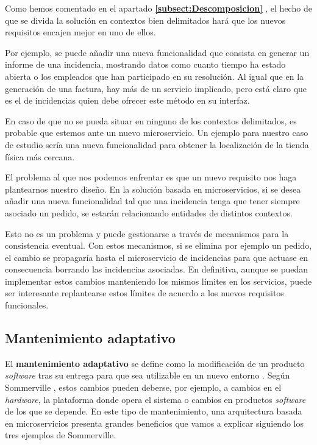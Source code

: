 \documentclass[11pt,spanish,listoffigures]{tfgetsinf}
\begin{document}
Como hemos comentado en el apartado \textbf{\ref{subsect:Descomposicion} }, el hecho de que se divida la solución en contextos bien delimitados hará que los nuevos requisitos encajen mejor en uno de ellos.

Por ejemplo, se puede añadir una nueva funcionalidad que consista en generar un informe de una incidencia, mostrando datos como cuanto tiempo ha estado abierta o los empleados que han participado en su resolución. Al igual que en la generación de una factura, hay más de un servicio implicado, pero está claro que es el de incidencias quien debe ofrecer este método en su interfaz.

En caso de que no se pueda situar en ninguno de los contextos delimitados, es probable que estemos ante un nuevo microservicio. Un ejemplo para nuestro caso de estudio sería una nueva funcionalidad para obtener la localización de la tienda física más cercana.

El problema al que nos podemos enfrentar es que un nuevo requisito nos haga plantearnos nuestro diseño. En la solución basada en microservicios, si se desea añadir una nueva funcionalidad tal que una incidencia tenga que tener siempre asociado un pedido, se estarán relacionando entidades de distintos contextos. 

Esto no es un problema y puede gestionarse a través de mecanismos para la consistencia eventual. Con estos mecanismos, si se elimina por ejemplo un pedido, el cambio se propagaría hasta el microservicio de incidencias para que actuase en consecuencia borrando las incidencias asociadas. En definitiva, aunque se puedan implementar estos cambios manteniendo los mismos límites en los servicios, puede ser interesante replantearse estos límites de acuerdo a los nuevos requisitos funcionales.

\subsection{Mantenimiento adaptativo}

El \textbf{mantenimiento adaptativo} se define como la modificación de un producto \textit{software} tras su entrega para que sea utilizable en un nuevo entorno \cite{Bourque2014}. Según Sommerville \cite{Sommerville2010}, estos cambios pueden deberse, por ejemplo, a cambios en el \textit{hardware}, la plataforma donde opera el sistema o cambios en productos \textit{software} de los que se depende. En este tipo de mantenimiento, una arquitectura basada en microservicios presenta grandes beneficios que vamos a explicar siguiendo los tres ejemplos de Sommerville.
\end{document}
